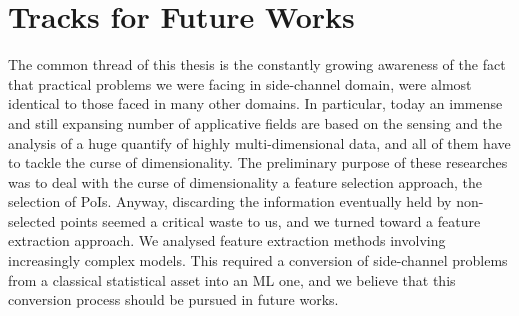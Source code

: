 \section{Tracks for Future Works}

The common thread of this thesis is the constantly growing awareness of the fact that practical problems we were facing in side-channel domain, were almost identical to those faced in many other domains. In particular, today an immense and still expansing number of applicative fields are based on the sensing and the analysis of a huge quantify of highly multi-dimensional data, and all of them have to tackle the curse of dimensionality. The preliminary purpose of these researches was to deal with the curse of dimensionality \via a feature selection approach, \ie the selection of PoIs. Anyway, discarding the information eventually held by non-selected points seemed a critical waste to us, and we turned toward a feature extraction approach. We analysed feature extraction methods involving increasingly complex models. This required a conversion of side-channel problems from a classical statistical asset into an ML one, and we believe that this conversion process should be pursued in future works.\\




